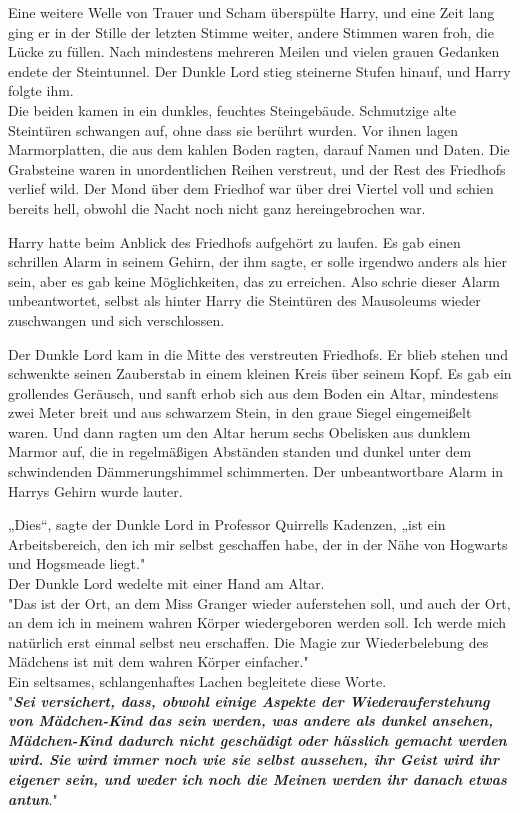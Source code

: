 {Eine weitere Welle von Trauer und Scham überspülte Harry, und eine Zeit lang ging er in der Stille der letzten Stimme weiter, andere Stimmen waren froh, die Lücke zu füllen. Nach mindestens mehreren Meilen und vielen grauen Gedanken endete der Steintunnel. Der Dunkle Lord stieg steinerne Stufen hinauf, und Harry folgte ihm.\\ Die beiden kamen in ein dunkles, feuchtes Steingebäude. Schmutzige alte Steintüren schwangen auf, ohne dass sie berührt wurden. Vor ihnen lagen Marmorplatten, die aus dem kahlen Boden ragten, darauf Namen und Daten. Die Grabsteine waren in unordentlichen Reihen verstreut, und der Rest des Friedhofs verlief wild. Der Mond über dem Friedhof war über drei Viertel voll und schien bereits hell, obwohl die Nacht noch nicht ganz hereingebrochen war.

Harry hatte beim Anblick des Friedhofs aufgehört zu laufen. Es gab einen schrillen Alarm in seinem Gehirn, der ihm sagte, er solle irgendwo anders als hier sein, aber es gab keine Möglichkeiten, das zu erreichen. Also schrie dieser Alarm unbeantwortet, selbst als hinter Harry die Steintüren des Mausoleums wieder zuschwangen und sich verschlossen.

Der Dunkle Lord kam in die Mitte des verstreuten Friedhofs. Er blieb stehen und schwenkte seinen Zauberstab in einem kleinen Kreis über seinem Kopf. Es gab ein grollendes Geräusch, und sanft erhob sich aus dem Boden ein Altar, mindestens zwei Meter breit und aus schwarzem Stein, in den graue Siegel eingemeißelt waren. Und dann ragten um den Altar herum sechs Obelisken aus dunklem Marmor auf, die in regelmäßigen Abständen standen und dunkel unter dem schwindenden Dämmerungshimmel schimmerten. Der unbeantwortbare Alarm in Harrys Gehirn wurde lauter.

„Dies“, sagte der Dunkle Lord in Professor Quirrells Kadenzen, „ist ein Arbeitsbereich, den ich mir selbst geschaffen habe, der in der Nähe von Hogwarts und Hogsmeade liegt."\\ Der Dunkle Lord wedelte mit einer Hand am Altar.\\ "Das ist der Ort, an dem Miss Granger wieder auferstehen soll, und auch der Ort, an dem ich in meinem wahren Körper wiedergeboren werden soll. Ich werde mich natürlich erst einmal selbst neu erschaffen. Die Magie zur Wiederbelebung des Mädchens ist mit dem wahren Körper einfacher."\\ Ein seltsames, schlangenhaftes Lachen begleitete diese Worte.\\ "\textbf{\emph{Sei versichert, dass, obwohl einige Aspekte der Wiederauferstehung von Mädchen-Kind das sein werden, was andere als dunkel ansehen, Mädchen-Kind dadurch nicht geschädigt oder hässlich gemacht werden wird. Sie wird immer noch wie sie selbst aussehen, ihr Geist wird ihr eigener sein, und weder ich noch die Meinen werden ihr danach etwas antun}}."

}

